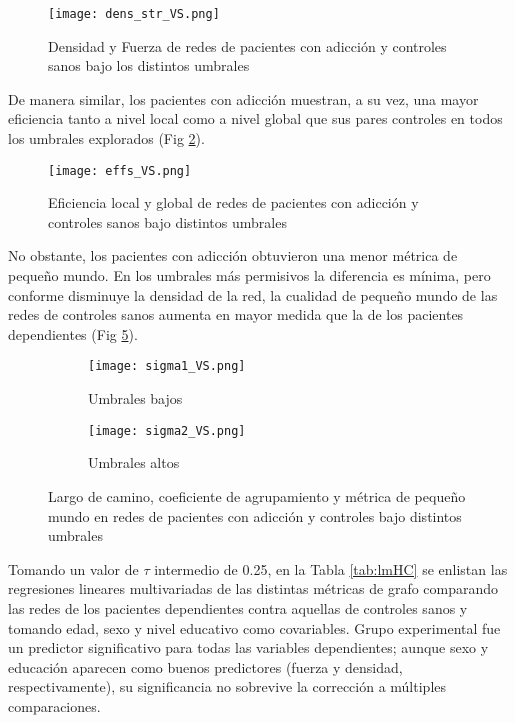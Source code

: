 \begin{figure}[!ht]
    \centering
    \texttt{[image: dens\_str\_VS.png]}
    \caption{Densidad y Fuerza de redes de pacientes con adicción y controles sanos bajo los distintos umbrales}
    \label{fig:dsHC}
\end{figure}

De manera similar, los pacientes con adicción muestran, a su vez, una mayor eficiencia tanto a nivel local como a nivel global que sus pares controles en todos los umbrales explorados (Fig \ref{fig:effHC}).

\begin{figure}[!ht]
    \centering
    \texttt{[image: effs\_VS.png]}
    \caption{Eficiencia local y global de redes de pacientes con adicción y controles sanos bajo distintos umbrales}
    \label{fig:effHC}
\end{figure}

No obstante, los pacientes con adicción obtuvieron una menor métrica de pequeño mundo.
En los umbrales más permisivos la diferencia es mínima, pero conforme disminuye la densidad de la red, la cualidad de pequeño mundo de las redes de controles sanos aumenta en mayor medida que la de los pacientes dependientes (Fig \ref{fig:sigmaHC}).

\begin{figure}[!ht]
    \centering
    \begin{subfigure}[t]{0.8\textwidth}
        \centering
        \texttt{[image: sigma1\_VS.png]}
        \caption{Umbrales bajos}
        \label{fig:sigma1}
    \end{subfigure}
    \begin{subfigure}[t]{0.8\textwidth}
        \centering
        \texttt{[image: sigma2\_VS.png]}
        \caption{Umbrales altos}
        \label{fig:sigma2}
    \end{subfigure}
    \caption{Largo de camino, coeficiente de agrupamiento y métrica de pequeño mundo en redes de pacientes con adicción y controles bajo distintos umbrales}
    \label{fig:sigmaHC}
\end{figure}

Tomando un valor de $\tau$ intermedio de 0.25, en la Tabla \ref{tab:lmHC} se enlistan las regresiones lineares multivariadas de las distintas métricas de grafo comparando las redes de los pacientes dependientes contra aquellas de controles sanos y tomando edad, sexo y nivel educativo como covariables. Grupo experimental fue un predictor significativo para todas las variables dependientes; aunque sexo y educación aparecen como buenos predictores (fuerza y densidad, respectivamente), su significancia no sobrevive la corrección a múltiples comparaciones.

